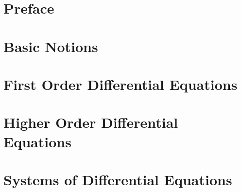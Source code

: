 \documentclass[oneside]{book}
\begin{document}
\pagebreak

\tableofcontents

\setcounter{tocdepth}{4}
\setcounter{secnumdepth}{4}

\pagebreak

\chapter*{Preface}



\mainmatter

\begin{savequote}

\end{savequote}
\chapter{Basic Notions} \label{chapter:basicnotions}

    

\begin{savequote}

\end{savequote}
\chapter{First Order Differential Equations} \label{chapter:firstorder}

    

    
\begin{savequote}

\end{savequote}
\chapter{Higher Order Differential Equations} \label{chapter:secondorder}

    

\begin{savequote}

\end{savequote}
\chapter{Systems of Differential Equations} \label{chapter:systems}
\end{document}
